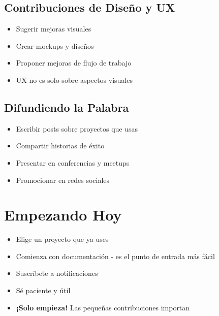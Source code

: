 \documentclass{presentacion}
\begin{document}
\subsection{Contribuciones de Diseño y UX}
\begin{frame}
    \begin{itemize}[<+->]
        \item Sugerir mejoras visuales
        \item Crear mockups y diseños
        \item Proponer mejoras de flujo de trabajo
        \item UX no es solo sobre aspectos visuales
    \end{itemize}
    
    \vspace{1em}
\end{frame}

\subsection{Difundiendo la Palabra}
\begin{frame}
    \begin{itemize}[<+->]
        \item Escribir posts sobre proyectos que usas
        \item Compartir historias de éxito
        \item Presentar en conferencias y meetups
        \item Promocionar en redes sociales
    \end{itemize}
    
    \vspace{1em}
\end{frame}

\section{Empezando Hoy}

\begin{frame}
    \begin{itemize}[<+->]
        \item Elige un proyecto que ya uses
        \item Comienza con documentación - es el punto de entrada más fácil
        \item Suscríbete a notificaciones
        \item Sé paciente y útil
        \item \textbf{¡Solo empieza!} Las pequeñas contribuciones importan
    \end{itemize}
    
    \vspace{2em}
\end{frame}
\end{document}
